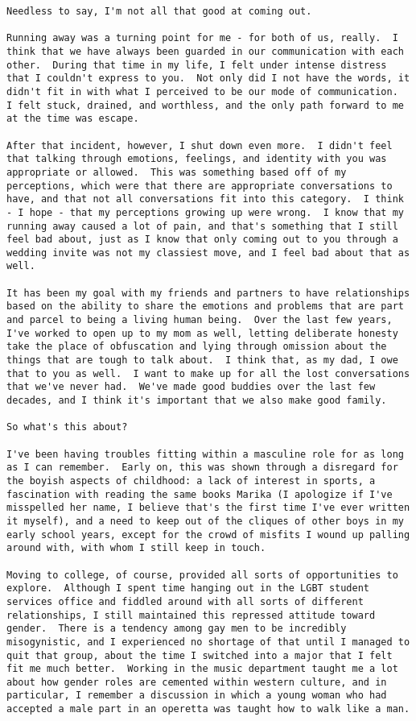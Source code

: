 \begin{verbatim}
Needless to say, I'm not all that good at coming out.

Running away was a turning point for me - for both of us, really.  I think that we have always been guarded in our communication with each other.  During that time in my life, I felt under intense distress that I couldn't express to you.  Not only did I not have the words, it didn't fit in with what I perceived to be our mode of communication.  I felt stuck, drained, and worthless, and the only path forward to me at the time was escape.

After that incident, however, I shut down even more.  I didn't feel that talking through emotions, feelings, and identity with you was appropriate or allowed.  This was something based off of my perceptions, which were that there are appropriate conversations to have, and that not all conversations fit into this category.  I think - I hope - that my perceptions growing up were wrong.  I know that my running away caused a lot of pain, and that's something that I still feel bad about, just as I know that only coming out to you through a wedding invite was not my classiest move, and I feel bad about that as well.

It has been my goal with my friends and partners to have relationships based on the ability to share the emotions and problems that are part and parcel to being a living human being.  Over the last few years, I've worked to open up to my mom as well, letting deliberate honesty take the place of obfuscation and lying through omission about the things that are tough to talk about.  I think that, as my dad, I owe that to you as well.  I want to make up for all the lost conversations that we've never had.  We've made good buddies over the last few decades, and I think it's important that we also make good family.

So what's this about?

I've been having troubles fitting within a masculine role for as long as I can remember.  Early on, this was shown through a disregard for the boyish aspects of childhood: a lack of interest in sports, a fascination with reading the same books Marika (I apologize if I've misspelled her name, I believe that's the first time I've ever written it myself), and a need to keep out of the cliques of other boys in my early school years, except for the crowd of misfits I wound up palling around with, with whom I still keep in touch.

Moving to college, of course, provided all sorts of opportunities to explore.  Although I spent time hanging out in the LGBT student services office and fiddled around with all sorts of different relationships, I still maintained this repressed attitude toward gender.  There is a tendency among gay men to be incredibly misogynistic, and I experienced no shortage of that until I managed to quit that group, about the time I switched into a major that I felt fit me much better.  Working in the music department taught me a lot about how gender roles are cemented within western culture, and in particular, I remember a discussion in which a young woman who had accepted a male part in an operetta was taught how to walk like a man.


\end{verbatim}
